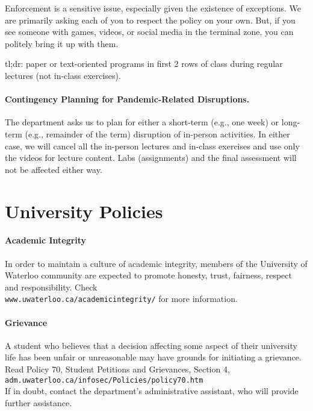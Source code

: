 \documentclass[letterpaper,10pt]{article}
\begin{document}
Enforcement is a sensitive issue, especially given the existence of
exceptions. We are primarily asking each of you to respect the policy
on your own. But, if you see someone with games, videos, or social
media in the terminal zone, you can politely bring it up with them.

tl;dr: paper or text-oriented programs in first 2 rows of class during regular lectures (not in-class exercises).

\paragraph{Contingency Planning for Pandemic-Related Disruptions.}
The department asks us to plan for either a short-term (e.g., one week) or long-term (e.g., remainder of the term) disruption of in-person activities. In either case, we will cancel all the in-person lectures and in-class exercises and use only the videos for lecture content. Labs (assignments) and the final assessment will not be affected either way.

\section*{University Policies}

\paragraph{Academic Integrity}
In order to maintain a culture of academic integrity, members of the University of Waterloo community are expected to promote honesty, trust, fairness, respect and responsibility. Check\\
\texttt{www.uwaterloo.ca/academicintegrity/} for more information.

\paragraph{Grievance}
A student who believes that a decision affecting some aspect of their university life has been unfair or unreasonable may have grounds for initiating a grievance. Read Policy 70, Student Petitions and Grievances, Section 4, \texttt{adm.uwaterloo.ca/infosec/Policies/policy70.htm} \\
If in doubt, contact the department's administrative assistant, who will provide further assistance.
\end{document}
